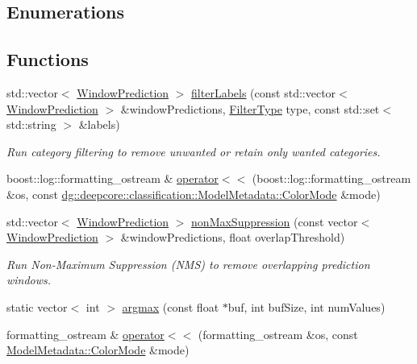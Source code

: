 \subsection*{Enumerations}
\subsection*{Functions}
\begin{DoxyCompactItemize}
\item 
std\+::vector$<$ \hyperlink{structdg_1_1deepcore_1_1classification_1_1_window_prediction}{Window\+Prediction} $>$ \hyperlink{group___classification_module_ga099af7f7bc5f6030c39c39f3f8fdcf8d}{filter\+Labels} (const std\+::vector$<$ \hyperlink{structdg_1_1deepcore_1_1classification_1_1_window_prediction}{Window\+Prediction} $>$ \&window\+Predictions, \hyperlink{group___classification_module_ga6915e250f3155525f9d14c0aed87a868}{Filter\+Type} type, const std\+::set$<$ std\+::string $>$ \&labels)
\begin{DoxyCompactList}\small\item\em Run category filtering to remove unwanted or retain only wanted categories. \end{DoxyCompactList}\item 
boost\+::log\+::formatting\+\_\+ostream \& \hyperlink{namespacedg_1_1deepcore_1_1classification_a71edab714c1d4f9c5553d587fd4b4dc2}{operator$<$$<$} (boost\+::log\+::formatting\+\_\+ostream \&os, const \hyperlink{group___classification_module_gafa8e703c3646c5f93ada56f3c811aac7}{dg\+::deepcore\+::classification\+::\+Model\+Metadata\+::\+Color\+Mode} \&mode)
\item 
std\+::vector$<$ \hyperlink{structdg_1_1deepcore_1_1classification_1_1_window_prediction}{Window\+Prediction} $>$ \hyperlink{group___classification_module_ga30426b4ff4fd24cceff0dda284ea4a05}{non\+Max\+Suppression} (const vector$<$ \hyperlink{structdg_1_1deepcore_1_1classification_1_1_window_prediction}{Window\+Prediction} $>$ \&window\+Predictions, float overlap\+Threshold)
\begin{DoxyCompactList}\small\item\em Run Non-\/\+Maximum Suppression (N\+MS) to remove overlapping prediction windows. \end{DoxyCompactList}\item 
static vector$<$ int $>$ \hyperlink{namespacedg_1_1deepcore_1_1classification_a5b4de12eaaa47332fd96160adb152d6e}{argmax} (const float $\ast$buf, int buf\+Size, int num\+Values)
\item 
formatting\+\_\+ostream \& \hyperlink{group___classification_module_ga2ca3a003d928630b46eed89e774eda35}{operator$<$$<$} (formatting\+\_\+ostream \&os, const \hyperlink{group___classification_module_gafa8e703c3646c5f93ada56f3c811aac7}{Model\+Metadata\+::\+Color\+Mode} \&mode)

\end{DoxyCompactItemize}
